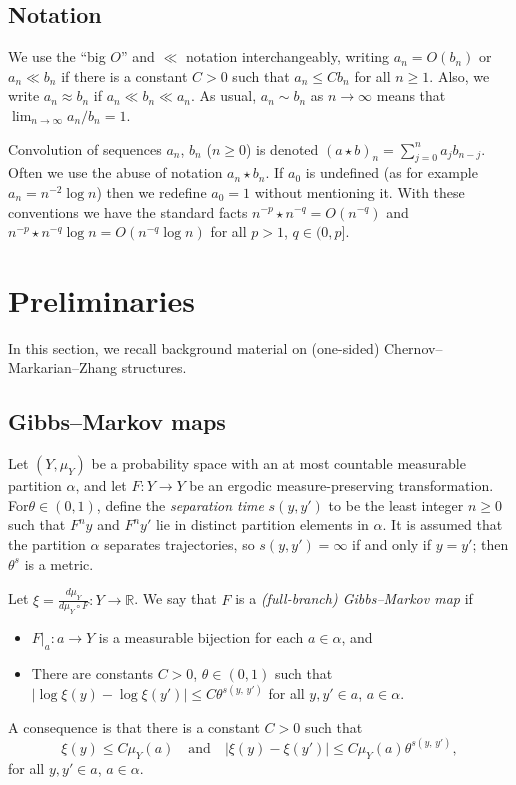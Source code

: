 \documentclass[AHL,Unicode,longabstracts,published]{cedram}
\newcommand{\R}{\mathbb{R}}
\begin{document}
\subsection*{Notation}
We use the ``big $O$'' and $\ll$ notation interchangeably, writing $a_n=O(b_n)$ or $a_n\ll b_n$ if there is a constant $C>0$ such that $a_n\le Cb_n$ for all $n\ge1$. Also, we write $a_n\approx b_n$ if $a_n\ll b_n\ll a_n$. As usual, $a_n\sim b_n$ as $n\to\infty$ means that $\lim_{n\to\infty}a_n/b_n=1$.

Convolution of sequences $a_n$, $b_n$ ($n\ge0$) is denoted $(a\star b)_n=\sum_{j=0}^n a_j b_{n-j}$. Often we use the abuse of notation $a_n\star b_n$. If $a_0$ is undefined (as for example $a_n=n^{-2}\log n$) then we redefine $a_0=1$ without mentioning it. With these conventions we have the standard facts $n^{-p}\star n^{-q}=O(n^{-q})$ and $n^{-p}\star n^{-q}\log n=O(n^{-q}\log n)$ for all $p>1$, $q\in(0,p]$.


\section{Preliminaries}\label{sec:prel}

In this section, we recall background material on (one-sided) Chernov--Markarian--Zhang structures.

\subsection{Gibbs--Markov maps}

Let $(Y,\mu_Y)$ be a probability space with an at most countable measurable partition $\alpha$, and let $F:Y\to Y$ be an ergodic measure-preserving transformation. For\linebreak$\theta\in(0,1)$, define the \emph{separation time} $s(y,y')$ to be the least integer $n\ge0$ such that $F^ny$ and $F^ny'$ lie in distinct partition elements in $\alpha$. It is assumed that the partition $\alpha$ separates trajectories, so $s(y,y')=\infty$ if and only if $y=y'$; then $\theta^s$ is a metric.

Let $\xi=\frac{d\mu_Y}{d\mu_Y\circ F}:Y\to\R$. We say that $F$ is a \emph{(full-branch) Gibbs--Markov map} if
\begin{itemize}
\item $F|_a:a\to Y$ is a measurable bijection for each $a\in\alpha$, and
\item There are constants $C>0$, $\theta\in(0,1)$ such that $|\log\xi(y)-\log\xi(y')|\le C\theta^{s(y,\,y')}$ for all $y,y'\in a$, $a\in\alpha$.
\end{itemize}
A consequence is that there is a constant $C>0$ such that
\begin{equation}\label{eq:GM}
\xi(y)\le C\mu_Y(a) \quad\text{and} \quad |\xi(y)-\xi(y')|\le C\mu_Y(a)\theta^{s(y,\,y')},
\end{equation}
for all $y,y'\in a$, $a\in\alpha$.
\end{document}
